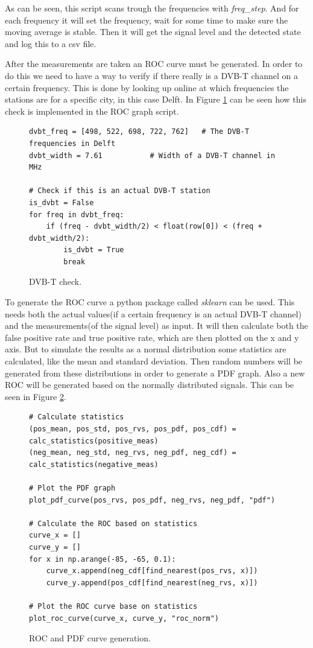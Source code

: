 \documentclass[]{article}
\begin{document}
As can be seen, this script scans trough the frequencies with \textit{freq\_step}.
And for each frequency it will set the frequency, wait for some time to make sure the moving average is stable.
Then it will get the signal level and the detected state and log this to a csv file.

After the measurements are taken an ROC curve must be generated.
In order to do this we need to have a way to verify if there really is a DVB-T channel on a certain frequency.
This is done by looking up online at which frequencies the stations are for a specific city, in this case Delft.
In Figure \ref{fig:dvbt_check} can be seen how this check is implemented in the ROC graph script.

\begin{figure}[H]
\begin{lstlisting}[frame=bt]
dvbt_freq = [498, 522, 698, 722, 762] 	# The DVB-T frequencies in Delft
dvbt_width = 7.61			# Width of a DVB-T channel in MHz

# Check if this is an actual DVB-T station
is_dvbt = False
for freq in dvbt_freq:
	if (freq - dvbt_width/2) < float(row[0]) < (freq + dvbt_width/2):
		is_dvbt = True
		break
\end{lstlisting}
\caption{DVB-T check.\label{fig:dvbt_check}}
\end{figure}

To generate the ROC curve a python package called \textit{sklearn} can be used.
This needs both the actual values(if a certain frequency is an actual DVB-T channel) and the measurements(of the signal level) as input.
It will then calculate both the false positive rate and true positive rate, which are then plotted on the x and y axis.
But to simulate the results as a normal distribution some statistics are calculated, like the mean and standard deviation.
Then random numbers will be generated from these distributions in order to generate a PDF graph.
Also a new ROC will be generated based on the normally distributed signals.
This can be seen in Figure \ref{fig:roc_gen}.

\begin{figure}[H]
\begin{lstlisting}[frame=bt]
# Calculate statistics
(pos_mean, pos_std, pos_rvs, pos_pdf, pos_cdf) = calc_statistics(positive_meas)
(neg_mean, neg_std, neg_rvs, neg_pdf, neg_cdf) = calc_statistics(negative_meas)

# Plot the PDF graph
plot_pdf_curve(pos_rvs, pos_pdf, neg_rvs, neg_pdf, "pdf")

# Calculate the ROC based on statistics
curve_x = []
curve_y = []
for x in np.arange(-85, -65, 0.1):
	curve_x.append(neg_cdf[find_nearest(pos_rvs, x)])
	curve_y.append(pos_cdf[find_nearest(neg_rvs, x)])

# Plot the ROC curve base on statistics
plot_roc_curve(curve_x, curve_y, "roc_norm")
\end{lstlisting}
\caption{ROC and PDF curve generation.\label{fig:roc_gen}}
\end{figure}
\end{document}
